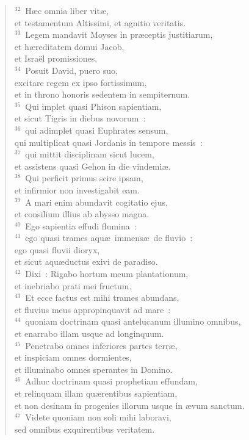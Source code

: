 \begin{flushleft}\begin{verse}${}^{32}$~H\ae c omnia liber vit\ae ,\\ et testamentum Altissimi, et agnitio veritatis.\\
${}^{33}$~Legem mandavit Moyses in pr\ae ceptis justitiarum,\\ et h\ae reditatem domui Jacob,\\ et Isra\"el promissiones.\\
${}^{34}$~Posuit David, puero suo,\\ excitare regem ex ipso fortissimum,\\ et in throno honoris sedentem in sempiternum.\\
${}^{35}$~Qui implet quasi Phison sapientiam,\\ et sicut Tigris in diebus novorum~:\\
${}^{36}$~qui adimplet quasi Euphrates sensum,\\ qui multiplicat quasi Jordanis in tempore messis~:\\
${}^{37}$~qui mittit disciplinam sicut lucem,\\ et assistens quasi Gehon in die vindemi\ae .\\
${}^{38}$~Qui perficit primus scire ipsam,\\ et infirmior non investigabit eam.\\
${}^{39}$~A mari enim abundavit cogitatio ejus,\\ et consilium illius ab abysso magna.\\
${}^{40}$~Ego sapientia effudi flumina~:\\
${}^{41}$~ego quasi trames aqu\ae\ immens\ae\ de fluvio~:\\ ego quasi fluvii dioryx,\\ et sicut aqu\ae ductus exivi de paradiso.\\
${}^{42}$~Dixi~: Rigabo hortum meum plantationum,\\ et inebriabo prati mei fructum.\\
${}^{43}$~Et ecce factus est mihi trames abundans,\\ et fluvius meus appropinquavit ad mare~:\\
${}^{44}$~quoniam doctrinam quasi antelucanum illumino omnibus,\\ et enarrabo illam usque ad longinquum.\\
${}^{45}$~Penetrabo omnes inferiores partes terr\ae ,\\ et inspiciam omnes dormientes,\\ et illuminabo omnes sperantes in Domino.\\
${}^{46}$~Adhuc doctrinam quasi prophetiam effundam,\\ et relinquam illam qu\ae rentibus sapientiam,\\ et non desinam in progenies illorum usque in \ae vum sanctum.\\
${}^{47}$~Videte quoniam non soli mihi laboravi,\\ sed omnibus exquirentibus veritatem.\end{verse}\end{flushleft}



